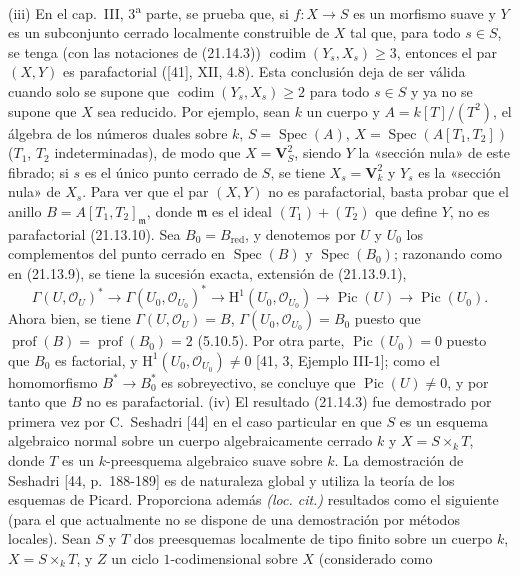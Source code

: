 \begin{env}[21.14.4]
(iii) En el cap.~III, 3\textsuperscript{a} parte, se prueba que, si $f:X\to S$ es un
morfismo suave y $Y$ es un subconjunto cerrado localmente construible de $X$ tal que,
para todo $s\in S$, se tenga (con las notaciones de (21.14.3))
$\operatorname{codim}(Y_s,X_s)\geq3$, entonces el par $(X,Y)$ es parafactorial
([41], XII, 4.8). Esta conclusión deja de ser válida cuando solo se supone que
$\operatorname{codim}(Y_s,X_s)\geq2$ para todo $s\in S$ y ya no se supone que
$X$ sea reducido. Por ejemplo, sean $k$ un cuerpo y $A=k[T]/(T^2)$, el álgebra de los números
duales sobre $k$, $S=\operatorname{Spec}(A)$,
$X=\operatorname{Spec}(A[T_1,T_2])$ ($T_1$, $T_2$ indeterminadas), de modo que
$X=\mathbf V_S^2$, siendo $Y$ la «sección nula» de este fibrado; si $s$ es el único
punto cerrado de $S$, se tiene $X_s=\mathbf V_k^2$ y $Y_s$ es la «sección nula» de
$X_s$. Para ver que el par $(X,Y)$ no es parafactorial, basta probar
que el anillo $B=A[T_1,T_2]_\mathfrak m$, donde $\mathfrak m$ es el ideal
$(T_1)+(T_2)$ que define $Y$, no es parafactorial (21.13.10). Sea
$B_0=B_{\mathrm{red}}$, y denotemos por $U$ y $U_0$ los complementos del punto cerrado
en $\operatorname{Spec}(B)$ y $\operatorname{Spec}(B_0)$; razonando como
en (21.13.9), se tiene la sucesión exacta, extensión de (21.13.9.1),
\[
  \Gamma(U,\mathcal O_U)^*\longrightarrow\Gamma(U_0,\mathcal O_{U_0})^*
  \longrightarrow\mathrm H^1(U_0,\mathcal O_{U_0})
  \longrightarrow\operatorname{Pic}(U)\longrightarrow\operatorname{Pic}(U_0).
\]
Ahora bien, se tiene $\Gamma(U,\mathcal O_U)=B$, $\Gamma(U_0,\mathcal O_{U_0})=B_0$ puesto que
$\operatorname{prof}(B)=\operatorname{prof}(B_0)=2$ (5.10.5). Por otra parte,
$\operatorname{Pic}(U_0)=0$ puesto que $B_0$ es factorial, y
$\mathrm H^1(U_0,\mathcal O_{U_0})\neq0$ [41, 3, Ejemplo III-1]; como
el homomorfismo $B^*\to B_0^*$ es sobreyectivo, se concluye que
$\operatorname{Pic}(U)\neq0$, y por tanto que $B$ no es parafactorial.
(iv) El resultado (21.14.3) fue demostrado por primera vez por C.~Seshadri [44] en el caso
particular en que $S$ es un esquema algebraico normal sobre un cuerpo algebraicamente cerrado
$k$ y $X=S\times_k T$, donde $T$ es un $k$-preesquema algebraico suave sobre $k$. La
demostración de Seshadri [44, p.~188-189] es de naturaleza global y utiliza la
teoría de los esquemas de Picard. Proporciona además \emph{(loc. cit.)} resultados
como el siguiente (para el que actualmente no se dispone de una demostración
por métodos locales). Sean $S$ y $T$ dos preesquemas localmente de tipo finito sobre un
cuerpo $k$, $X=S\times_k T$, y $Z$ un ciclo $1$-codimensional sobre $X$ (considerado como

\end{env}
